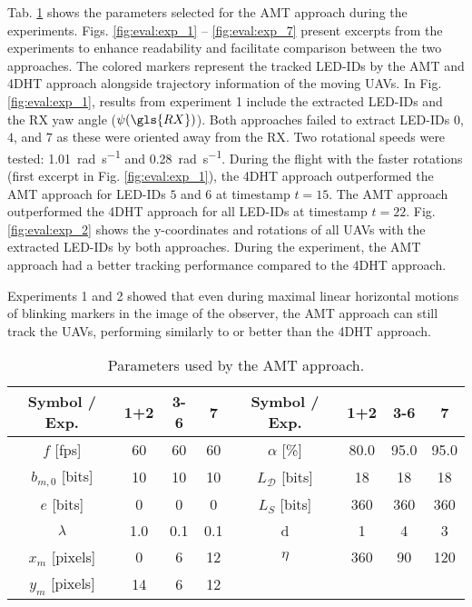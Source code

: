 \documentclass[lettersize,preprint]{elsarticle}
\begin{document}
Tab. \ref{tab:eval:params} shows the parameters selected for the \gls{AMT} approach during the experiments.
Figs. \ref{fig:eval:exp_1} -- \ref{fig:eval:exp_7} present excerpts from the experiments to enhance readability and facilitate comparison between the two approaches.
The colored markers represent the tracked \gls{LED}-IDs by the \gls{AMT} and \gls{4DHT} approach alongside trajectory information of the moving \glspl{UAV}. 
In Fig. \ref{fig:eval:exp_1}, results from experiment 1 include the extracted \gls{LED}-IDs and the \gls{RX} yaw angle ($\psi(\gls{RX})$).
Both approaches failed to extract \gls{LED}-IDs $0$, $4$, and $7$ as these were oriented away from the \gls{RX}.
Two rotational speeds were tested: \SI{1.01}{\radian\per\second} and \SI{0.28}{\radian\per\second}.
During the flight with the faster rotations (first excerpt in Fig. \ref{fig:eval:exp_1}), the \gls{4DHT} approach outperformed the \gls{AMT} approach for \gls{LED}-IDs $5$ and $6$ at timestamp $t=15$. 
The \gls{AMT} approach outperformed the \gls{4DHT} approach for all \gls{LED}-IDs at timestamp $t=22$. 
Fig. \ref{fig:eval:exp_2} shows the y-coordinates and rotations of all \glspl{UAV} with the extracted \gls{LED}-IDs by both approaches.
During the experiment, the \gls{AMT} approach had a better tracking performance compared to the \gls{4DHT} approach.

Experiments 1 and 2 showed that even during maximal linear horizontal motions of blinking markers in the image of the observer, the \gls{AMT} approach can still track the \glspl{UAV}, performing similarly to or better than the \gls{4DHT} approach.



\begingroup
\setlength{\tabcolsep}{3pt}
\renewcommand{\arraystretch}{1.05} %
\begin{table}[]
  \center
  \begin{tabular}{ c c c c | c c c c}
    Symbol / Exp. & 1+2 &  3-6 & 7 & Symbol / Exp. & 1+2 & 3-6 & 7 \\ 
    \hline
    $f$ [fps] & 60 & 60 & 60   & $\alpha$ [\%] & 80.0 & 95.0 & 95.0\\
    $b_{m,0}$ [bits] & 10 & 10 & 10 & $L_\mathcal{D}$ [bits] & 18 & 18 & 18\\   
    $e$ [bits] & 0 & 0 & 0 & $L_S$ [bits] & 360 & 360 & 360\\ 
    $\lambda$ & 1.0 & 0.1 & 0.1 & d & 1 & 4 & 3\\ 
    $x_{m}$ [pixels] & 0 & 6 & 12& $\eta$ & 360 & 90 & 120\\
    $y_{m}$ [pixels] & 14 & 6 & 12 & & \\
  \end{tabular}
  \caption{Parameters used by the \gls{AMT} approach.}
  \label{tab:eval:params}
\end{table}
\endgroup
\end{document}
